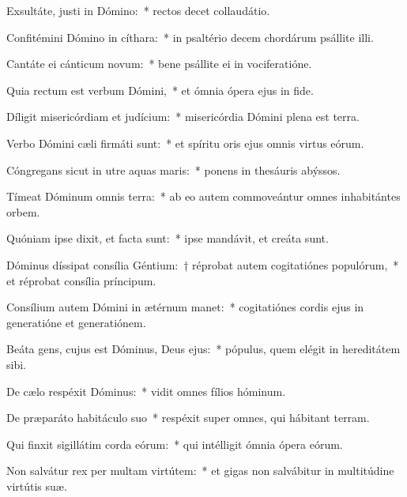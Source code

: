 \item Exsultáte, justi in Dómino:~* rectos decet collaudátio.

\item Confitémini Dómino in cíthara:~* in psaltério decem chordárum psállite illi.

\item Cantáte ei cánticum novum:~* bene psállite ei in vociferatióne.

\item Quia rectum est verbum Dómini,~* et ómnia ópera ejus in fide.

\item Díligit misericórdiam et judícium:~* misericórdia Dómini plena est terra.

\item Verbo Dómini cæli firmáti sunt:~* et spíritu oris ejus omnis virtus eórum.

\item Cóngregans sicut in utre aquas maris:~* ponens in thesáuris abýssos.

\item Tímeat Dóminum omnis terra:~* ab eo autem commoveántur omnes inhabitántes orbem.

\item Quóniam ipse dixit, et facta sunt:~* ipse mandávit, et creáta sunt.

\item Dóminus díssipat consília Géntium:~† réprobat autem cogitatiónes populórum,~* et réprobat consília príncipum.

\item Consílium autem Dómini in ætérnum manet:~* cogitatiónes cordis ejus in generatióne et generatiónem.

\item Beáta gens, cujus est Dóminus, Deus ejus:~* pópulus, quem elégit in hereditátem sibi.

\item De cælo respéxit Dóminus:~* vidit omnes fílios hóminum.

\item De præparáto habitáculo suo~* respéxit super omnes, qui hábitant terram.

\item Qui finxit sigillátim corda eórum:~* qui intélligit ómnia ópera eórum.

\item Non salvátur rex per multam virtútem:~* et gigas non salvábitur in multitúdine virtútis suæ.

